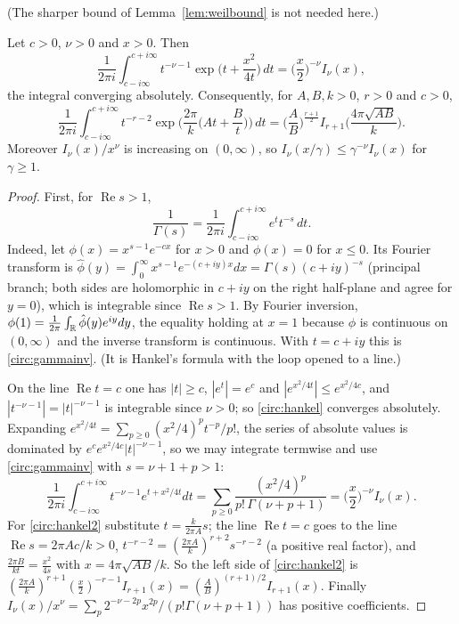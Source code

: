 (The sharper bound of Lemma~\ref{lem:weilbound} is not needed here.)

\begin{lemma}\label{circ:lem:bessel}
Let $c>0$, $\nu>0$ and $x>0$. Then
\begin{equation}\label{circ:hankel}
\frac1{2\pi i}\int_{c-i\infty}^{c+i\infty}t^{-\nu-1}\exp\Big(t+\frac{x^2}{4t}\Big)\,dt=\Big(\frac x2\Big)^{-\nu}I_\nu(x),
\end{equation}
the integral converging absolutely. Consequently, for $A,B,k>0$, $r>0$ and $c>0$,
\begin{equation}\label{circ:hankel2}
\frac1{2\pi i}\int_{c-i\infty}^{c+i\infty}t^{-r-2}\exp\Big(\frac{2\pi}k\Big(At+\frac Bt\Big)\Big)\,dt=\Big(\frac AB\Big)^{\frac{r+1}2}I_{r+1}\Big(\frac{4\pi\sqrt{AB}}k\Big).
\end{equation}
Moreover $I_\nu(x)/x^\nu$ is increasing on $(0,\infty)$, so $I_\nu(x/\gamma)\le\gamma^{-\nu}I_\nu(x)$ for $\gamma\ge1$.
\end{lemma}

\begin{proof}
First, for $\operatorname{Re}s>1$,
\begin{equation}\label{circ:gammainv}
\frac1{\Gamma(s)}=\frac1{2\pi i}\int_{c-i\infty}^{c+i\infty}e^tt^{-s}\,dt .
\end{equation}
Indeed, let $\phi(x)=x^{s-1}e^{-cx}$ for $x>0$ and $\phi(x)=0$ for $x\le0$. Its Fourier transform is $\hat\phi(y)=\int_0^\infty x^{s-1}e^{-(c+iy)x}dx=\Gamma(s)(c+iy)^{-s}$ (principal branch; both sides are holomorphic in $c+iy$ on the right half-plane and agree for $y=0$), which is integrable since $\operatorname{Re}s>1$. By Fourier inversion, $\phi(1)=\frac1{2\pi}\int_{\mathbb{R}}\hat\phi(y)e^{iy}dy$, the equality holding at $x=1$ because $\phi$ is continuous on $(0,\infty)$ and the inverse transform is continuous. With $t=c+iy$ this is \eqref{circ:gammainv}. (It is Hankel's formula \cite[\S12.22]{WW21} with the loop opened to a line.)

On the line $\operatorname{Re}t=c$ one has $|t|\ge c$, $|e^t|=e^c$ and $|e^{x^2/4t}|\le e^{x^2/4c}$, and $|t^{-\nu-1}|=|t|^{-\nu-1}$ is integrable since $\nu>0$; so \eqref{circ:hankel} converges absolutely. Expanding $e^{x^2/4t}=\sum_{p\ge0}(x^2/4)^pt^{-p}/p!$, the series of absolute values is dominated by $e^{c}e^{x^2/4c}|t|^{-\nu-1}$, so we may integrate termwise and use \eqref{circ:gammainv} with $s=\nu+1+p>1$:
\[
\frac1{2\pi i}\int_{c-i\infty}^{c+i\infty}t^{-\nu-1}e^{t+x^2/4t}dt=\sum_{p\ge0}\frac{(x^2/4)^p}{p!\,\Gamma(\nu+p+1)}=\Big(\frac x2\Big)^{-\nu}I_\nu(x).
\]
For \eqref{circ:hankel2} substitute $t=\frac k{2\pi A}s$; the line $\operatorname{Re}t=c$ goes to the line $\operatorname{Re}s=2\pi Ac/k>0$, $t^{-r-2}=(\frac{2\pi A}k)^{r+2}s^{-r-2}$ (a positive real factor), and $\frac{2\pi B}{kt}=\frac{x^2}{4s}$ with $x=4\pi\sqrt{AB}/k$. So the left side of \eqref{circ:hankel2} is $(\frac{2\pi A}k)^{r+1}(\frac x2)^{-r-1}I_{r+1}(x)=(\frac AB)^{(r+1)/2}I_{r+1}(x)$. Finally $I_\nu(x)/x^\nu=\sum_p 2^{-\nu-2p}x^{2p}/(p!\Gamma(\nu+p+1))$ has positive coefficients.
\end{proof}

